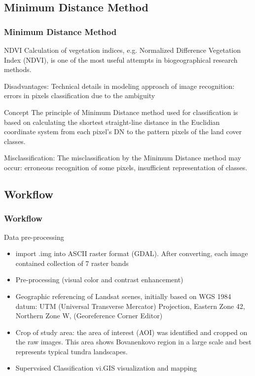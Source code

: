 \documentclass[pdflatex,compress,8pt,
	xcolor={dvipsnames,dvipsnames,svgnames,x11names,table},
	hyperref={colorlinks = true,
	breaklinks = true, 
	urlcolor = NavyBlue, 
	breaklinks = true}]{beamer}
\begin{document}
\subsection{Minimum Distance Method}
\begin{frame}\frametitle{Minimum Distance Method}

\begin{alertblock}{NDVI}
Calculation of vegetation indices, e.g. Normalized Difference Vegetation Index (NDVI), is one of the most useful attempts in biogeographical research methods.
\end{alertblock}

\begin{examples}{Disadvantages:}
Technical details in modeling approach of image recognition: errors in pixels classification due to the ambiguity
\end{examples}

\begin{block}{Concept}
The principle of Minimum Distance method used for classification is based on calculating the shortest straight-line distance in the Euclidian coordinate system from each pixel’s DN to the pattern pixels of the land cover classes.
\end{block}

\begin{examples}{Misclassification:}
The misclassification by the Minimum Distance method may occur: erroneous recognition of some pixels, insufficient representation of classes.
\end{examples}

\end{frame}

\subsection{Workflow}
\begin{frame}\frametitle{Workflow}
Data pre-processing
\begin{itemize}
         \item import .img into ASCII raster format (GDAL). After converting, each image contained collection of 7 raster bands 
	\item Pre-processing (visual color and contrast enhancement) 
	\item Geographic referencing of Landsat scenes, initially based on  WGS 1984 datum: UTM (Universal Transverse Mercator) Projection, Eastern Zone 42, Northern Zone W, (Georeference Corner Editor)
	\item Crop of study area: the area of interest (AOI) was identified and cropped on the raw images. This area shows Bovanenkovo region in a large scale and best represents typical tundra landscapes.
	\item Supervsised Classification vi.GIS visualization and mapping
\end{itemize}
\end{frame}
\end{document}

